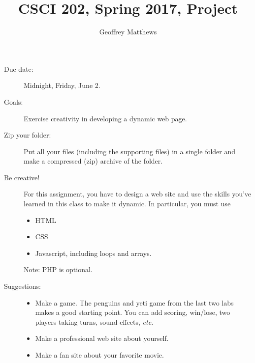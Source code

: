 \documentclass{article}
\title{CSCI 202, Spring 2017, Project}
\author{Geoffrey Matthews}
\begin{document}
\maketitle

\begin{description}

\item[Due date:] Midnight, Friday, June 2.

\item[Goals:] Exercise creativity in developing a dynamic web page.
  

\item[Zip your folder:]
  Put all your files (including the supporting files) in a single
  folder and  make a compressed (zip) archive of the folder.

\item[Be creative!]  For this assignment, you have to design a web
  site and use the skills you've learned in this class to make it
  dynamic.  In particular, you must use
  \begin{itemize}
  \item HTML
  \item CSS
  \item Javascript, including loops and arrays.
  \end{itemize}
Note: PHP is optional.  

\item[Suggestions:]
  \begin{itemize}
  \item
    Make a game.  The penguins and yeti game from the
    last two labs makes a good starting point.  You can add scoring,
    win/lose, two players taking turns, sound effects, {\em etc.}
  \item
    Make a professional web site about yourself.
  \item
    Make a fan site about your favorite movie.
  \end{itemize}
\end{description}
\end{document}

